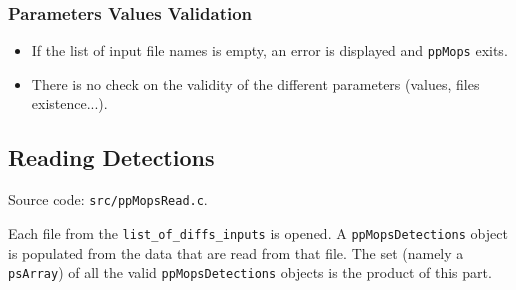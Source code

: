 \documentclass[panstarrs,spec]{panstarrs}
\begin{document}
\subsubsection{Parameters Values Validation}
\begin{itemize}
\item If the list of input file names is empty, an error is displayed
  and \texttt{ppMops} exits.
\item There is no check on the validity of the different parameters
  (values, files existence...).
\end{itemize}

\subsection{Reading Detections}
\label{sec-implementation-read}

Source code: \texttt{src/ppMopsRead.c}.

Each file from the \texttt{list\_of\_diffs\_inputs} is opened. A
\texttt{ppMopsDetections} object is populated from the data that are
read from that file. The set (namely a \texttt{psArray}) of all the
valid \texttt{ppMopsDetections} objects is the product of this part.
\end{document}
